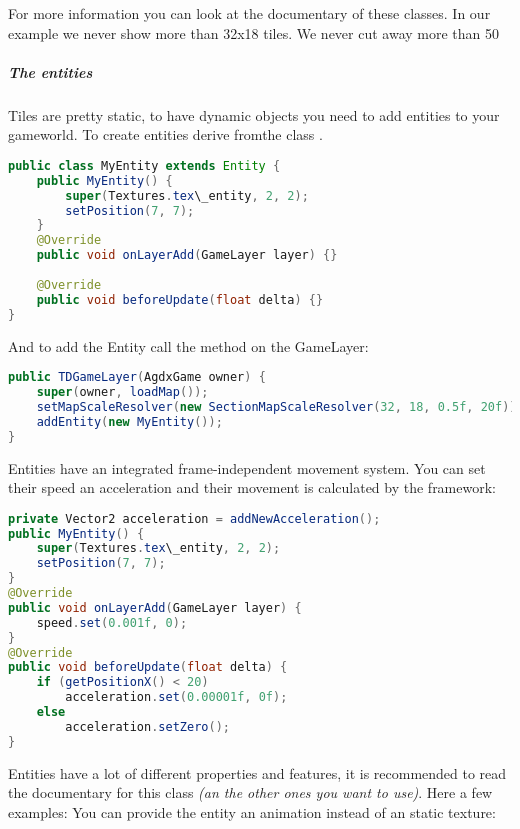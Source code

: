 For more information you can look at the documentary of these classes. In our example we never show more than 32x18 tiles. We never cut away more than 50%

\subparagraph{The entities}

Tiles are pretty static, to have dynamic objects you need to add entities to your gameworld. To create entities derive fromthe class .

\doinline
\begin{lstlisting}[caption=Markdown Tutorial: fenced code block, title=\hspace{0 pt}, language=java]
public class MyEntity extends Entity {
	public MyEntity() {
		super(Textures.tex\_entity, 2, 2);
		setPosition(7, 7);
	}
	@Override
	public void onLayerAdd(GameLayer layer) {}
	
	@Override
	public void beforeUpdate(float delta) {}
}
\end{lstlisting}

And to add the Entity call the  method on the GameLayer:

\doinline
\begin{lstlisting}[caption=Markdown Tutorial: fenced code block, title=\hspace{0 pt}, language=java]
public TDGameLayer(AgdxGame owner) {
	super(owner, loadMap());
	setMapScaleResolver(new SectionMapScaleResolver(32, 18, 0.5f, 20f));
	addEntity(new MyEntity());
}
\end{lstlisting}

Entities have an integrated frame-independent movement system. You can set their speed an acceleration and their movement is calculated by the framework:

\doinline
\begin{lstlisting}[caption=Markdown Tutorial: fenced code block, title=\hspace{0 pt}, language=java]
private Vector2 acceleration = addNewAcceleration();
public MyEntity() {
	super(Textures.tex\_entity, 2, 2);
	setPosition(7, 7);
}
@Override
public void onLayerAdd(GameLayer layer) {
	speed.set(0.001f, 0);
}
@Override
public void beforeUpdate(float delta) {
	if (getPositionX() < 20)
		acceleration.set(0.00001f, 0f);
	else
		acceleration.setZero();
}
\end{lstlisting}

Entities have a lot of different properties and features, it is recommended to read the documentary for this class \textit{(an the other ones you want to use)}. Here a few examples:
You can provide the entity an animation instead of an static texture:

